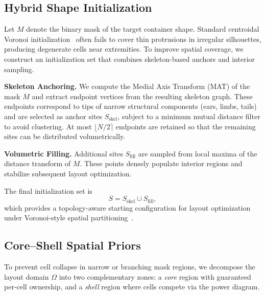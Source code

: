 
\subsection{Hybrid Shape Initialization}
\label{subsec:shape_init}

Let $M$ denote the binary mask of the target container shape.
Standard centroidal Voronoi initialization~\cite{du1999centroidal} often fails to cover
thin protrusions in irregular silhouettes, producing degenerate
cells near extremities. To improve spatial coverage, we construct
an initialization set that combines skeleton-based anchors and
interior sampling.

\textbf{Skeleton Anchoring.}
We compute the Medial Axis Transform (MAT) of the mask $M$ and
extract endpoint vertices from the resulting skeleton graph. These
endpoints correspond to tips of narrow structural components
(ears, limbs, tails) and are selected as anchor sites $S_{\text{skel}}$,
subject to a minimum mutual distance filter to avoid clustering.
At most $\lfloor N/2 \rceil$ endpoints are retained so that the
remaining sites can be distributed volumetrically.

\textbf{Volumetric Filling.}
Additional sites $S_{\text{fill}}$ are sampled from local maxima of the
distance transform of $M$. These points densely populate interior
regions and stabilize subsequent layout optimization.

The final initialization set is
\[
S = S_{\text{skel}} \cup S_{\text{fill}},
\]
which provides a topology-aware starting configuration for layout
optimization under Voronoi-style spatial partitioning~\cite{du1999centroidal}.

\subsection{Core--Shell Spatial Priors}
\label{subsec:core_shell}

To prevent cell collapse in narrow or branching mask regions, we decompose the layout domain $\Omega$ into two complementary zones: a \emph{core} region with guaranteed per-cell ownership, and a \emph{shell} region where cells compete via the power diagram.

